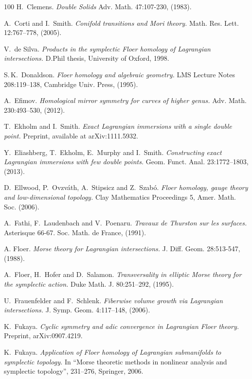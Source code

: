 \documentclass[11pt,a4paper]{article}
\numberwithin{equation}{section}
\begin{document}
\begin{thebibliography}{100}
H.~Clemens.
\emph{Double Solids}
Adv. Math. 47:107-230, (1983).

A.~Corti and I.~Smith.
\emph{Conifold transitions and Mori theory.}
Math. Res. Lett. 12:767--778, (2005).

V.~de Silva.
\emph{Products in the symplectic Floer homology of Lagrangian intersections.}
D.Phil thesis, University of Oxford, 1998.

S.\,K.~Donaldson.
\emph{Floer homology and algebraic geometry.}
LMS Lecture Notes 208:119--138, Cambridge Univ. Press, (1995).

A.~Efimov.
\emph{Homological mirror symmetry for curves of higher genus.}
Adv. Math. 230:493--530, (2012).

T.~Ekholm and I.~Smith.
\emph{Exact Lagrangian immersions with a single double point.}
Preprint, available at arXiv:1111.5932.

Y.~Eliashberg, T.~Ekholm, E.~Murphy and I.~Smith.
\emph{Constructing exact Lagrangian immersions with few double points.}
Geom. Funct. Anal. 23:1772--1803, (2013).

D.~Ellwood, P.~Ovzv\'ath, A.~Stipsicz and Z.~Szab\'o.
\emph{Floer homology, gauge theory and low-dimensional topology.}
Clay Mathematics Proceedings 5, Amer. Math. Soc. (2006).

A.~Fathi, F.~Laudenbach and V.~Poenaru.
\emph{Travaux de Thurston sur les surfaces.}
Asterisque 66-67.  Soc. Math. de France, (1991).

A. Floer.
\emph{Morse theory for Lagrangian intersections.}
J. Diff. Geom. 28:513-547, (1988).

A.~Floer, H.~Hofer and D.~Salamon.
\emph{Transversality in elliptic Morse theory for the symplectic action.}
Duke Math. J. 80:251--292, (1995).

U.~Frauenfelder and F.~Schlenk.
\emph{Fiberwise volume growth via Lagrangian intersections.}
J. Symp. Geom. 4:117--148, (2006).

K.~Fukaya.
\emph{Cyclic symmetry and adic convergence in Lagrangian Floer theory.}
Preprint, arXiv:0907.4219.

K.~Fukaya.
\emph{Application of Floer homology of Lagrangian submanifolds to symplectic topology.}
In ``Morse theoretic methods in nonlinear analysis and symplectic topology”, 231--276, Springer, 2006.


\end{thebibliography}
\end{document}
